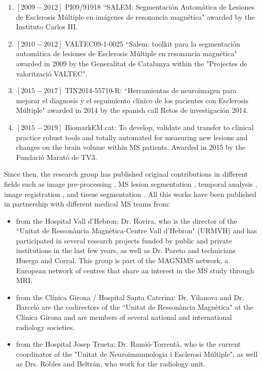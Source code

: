 \begin{enumerate}

\item $[2009-2012]$ PI09/91918 ``SALEM: Segmentaci\'{o}n Autom\'{a}tica de Lesiones de Esclerosis M\'{u}ltiple en im\'{a}genes de resonancia magn\'{e}tica" awarded by the Instituto Carlos III. 

\item $[2010-2012]$ VALTEC09-1-0025 ``Salem: toolkit para la segmentaci\'{o}n autom\'{a}tica de lesiones de Esclerosis M\'{u}ltiple en resonancia magn\'{e}tica" awarded in 2009 by the Generalitat de Catalunya within the "Projectes de valoritzaci\'{o} VALTEC".

\item $[2015-2017]$ TIN2014-55710-R: ``Herramientas de neuroimagen para mejorar el diagnosis y el seguimiento cl\'{i}nico de los pacientes con Esclerosis M\'{u}ltiple" awarded in 2014 by the spanish call Retos de investigaci\'{o}n 2014.

\item $[2015-2019]$ BiomarkEM.cat: To develop, validate and transfer to clinical practice robust tools and totally automated for measuring new lesions and changes on the brain volume within MS patients. Awarded in 2015 by the Fundaci\'{o} Marat\'{o} de TV3.

\end{enumerate}

Since then, the research group has published original contributions in different fields such as image pre-processing \cite{Roura2014}, MS lesion segmentation \cite{Cabezas2014, Cabezas2014b, Llado2012, Roura2015}, temporal analysis \cite{Ganiler2014,Llado2012b}, image registration \cite{Diez2014, Roura2015b}, and tissue segmentation \cite{Cabezas2011}. All this works have been published in partnership with different medical MS teams from:

\begin{itemize}

	\item from the Hospital Vall d'Hebron: Dr. Rovira, who is the director of the ``Unitat de Resson\`{a}ncia Magn\`{e}tica-Centre Vall d'Hebron" (URMVH) and has participated in several research projects funded by public and private institutions in the last few years, as well as Dr. Pareto and technicians Huerga and Corral. This group is part of the MAGNIMS network, a European network of centres that share an interest in the MS study through MRI.
 
	 \item from the Cl\'{i}nica Girona / Hospital Santa Caterina: Dr. Vilanova and Dr. Barcel\'{o} are the codirectors of the ``Unitat de Resson\`{a}ncia Magn\`{e}tica" at the Cl\'{i}nica Girona and are members of several national and international radiology societies.
 
	\item from the Hospital Josep Trueta: Dr. Rami\'{o}-Torrent\`{a}, who is the current coordinator of the "Unitat de Neuroimmunologia i Esclerosi M\'{u}ltiple", as well as Drs. Robles and Beltr\'{a}n, who work for the radiology unit.

\end{itemize}


